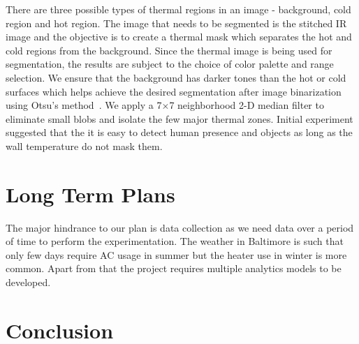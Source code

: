 \documentclass{sig-alternate}
\begin{document}
There are three possible types of thermal regions in an image - background, cold region and hot region. The image that needs to be segmented is the stitched IR image and the objective is to create a thermal mask which separates the hot and cold regions from the background. Since the thermal image is being used for segmentation, the results are subject to the choice of color palette and range selection.  We ensure that the background has darker tones than the hot or cold surfaces which helps achieve the desired segmentation after image binarization using Otsu's method~\cite{OTSU}. We apply a 7$\times$7 neighborhood 2-D median filter to eliminate small blobs and isolate the few major thermal zones. Initial experiment suggested that the it is easy to detect human presence and objects as long as the wall temperature do not mask them. 
 
\section{Long Term Plans}

\indent The major hindrance to our plan is data collection as we need data over a period of time to perform the experimentation. The weather in Baltimore is such that only few days require AC usage in summer but the heater use in winter is more common. Apart from that the project requires multiple analytics models to be developed.
 
\section{Conclusion}
 
\end{document}
